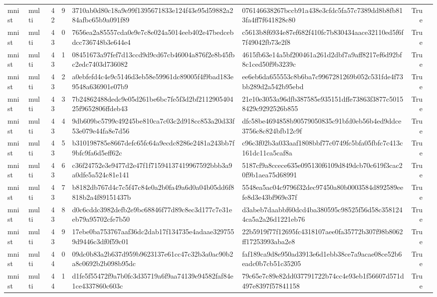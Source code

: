 \begin{tabular}{llrrllrl}
mnist & multi & 42 & 9 & 3710ab0d80c18a9e99f1395671833e124f43e95d59882a284afbc65b9a091f89 & 076146638267bccb91a438e3cfdc5fa57c7389dd8b8fb813fa4ff7f641828c80 & True &  \\
mnist & multi & 43 & 0 & 7656ea2a85557cda0e9e7c8e024a5014eeb402e47bedcebdcc736748b3e644e4 & c5613b8f6934e87ef682f410fc7b830434aace32110ed5f6f7f49042fb73e2f8 & True &  \\
mnist & multi & 43 & 1 & 08451673a97fef7d13ccd9d9cd67cb46004a876f2e8b45fbc2edc7403d736082 & 4615fb63e14a5bf200461a261d2dbf7a9aff8217ef6d92bf8c1ced50f9b3239c & True &  \\
mnist & multi & 43 & 2 & a0ebfefd4c4e9c5146d3eb58e59961dc89005f4f9bad183e9548a636901e07b9 & ee6eb6da655553c8b6ba7c9967281269b052c531fde4f73bb289d2a542b95ebd & True &  \\
mnist & multi & 43 & 3 & 7b24862488dedc9e05d261be6bc7fe5f3d2bf211290540425f9652806ffdeb43 & 21e10e3053a96dfb387585e935151dffe73863f3877c50158429c9292526b855 & True &  \\
mnist & multi & 43 & 4 & 9db609bc5799c49245be810ca7c03c2d918cc853a20d33f53e079e44fa8e7d56 & dfc58be4694858b90579050835c91bfd0eb56b4ed9ddce3756c8c824bfb12c9f & True &  \\
mnist & multi & 43 & 5 & b310198785e8667defc65fc64a9ecdc8286e2481a243bb7f9bfc9fa6d5eff62c & c96c3f02b3a033aaf1808bbf77c0749fc5bfa05fbfc7c413c161dc11ca5caf8a & True &  \\
mnist & multi & 43 & 6 & c36f24752e3e9477d2e47f1f71594137419967592bbb3a9a0dfe5a524c81e141 & 5187cf9a8ccece635e095130f6109d849dcb70c619f3cac20f9b1aea75d68991 & True &  \\
mnist & multi & 43 & 7 & b8182db767d4c7c5f47c84e0a2b0fa49a6d0a04b05dd6f8818b2a4f89151437b & 5548ea5ac04c9796f32dec97450a80b0003584d892589eefe8d3e43bf969e37f & True &  \\
mnist & multi & 43 & 8 & d0c6cddc3982defb2e9bc68846f77d89c8ec3d177c7e31eeb79a95702cfe7b50 & d3abeb7daabbf60dcd4ba380595c98525f56d58c3581244ca5a2a26d1221eb76 & True &  \\
mnist & multi & 43 & 9 & 17ebe0ba753767aaf36dc2dab17f134735e4adaae3297559d9446c3df0f59c01 & 22b5919f77f12695fc4318107aee0fa35772b307f98b8062ff17253993aba2e8 & True &  \\
mnist & multi & 44 & 0 & 09dc0b83a2b637d959b9623137e61cc47c32b3a0ac90b2a8c0692b2b098b95dc & faf189ca9d8e950ad3913e6d1ebb38ce7a9acae08ce52b6eadc0b7cb51c35205 & True &  \\
mnist & multi & 44 & 1 & d1fe5f55472f9a7b0fc3d35719a6f9aa74139e94582faf84e1ce4337860c603c & 79c65e7c89e82dd037791722b74cc4e93eb1f56607d571d497e8397f57841158 & True &  \\

\end{tabular}
